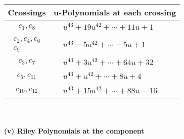 \documentclass[1p]{elsarticle_modified}
\theoremstyle{definition}
\begin{document}
\begin{tabular}{m{50pt}|m{274pt}}
Crossings & \hspace{64pt}u-Polynomials at each crossing \\
\hline $$\begin{aligned}c_{1},c_{8}\end{aligned}$$&$\begin{aligned}
&u^{43}+19 u^{42}+\cdots+11 u+1
\end{aligned}$\\
\hline $$\begin{aligned}c_{2},c_{4},c_{6}\\c_{9}\end{aligned}$$&$\begin{aligned}
&u^{43}-5 u^{42}+\cdots-5 u+1
\end{aligned}$\\
\hline $$\begin{aligned}c_{3},c_{7}\end{aligned}$$&$\begin{aligned}
&u^{43}+3 u^{42}+\cdots+64 u+32
\end{aligned}$\\
\hline $$\begin{aligned}c_{5},c_{11}\end{aligned}$$&$\begin{aligned}
&u^{43}+u^{42}+\cdots+8 u+4
\end{aligned}$\\
\hline $$\begin{aligned}c_{10},c_{12}\end{aligned}$$&$\begin{aligned}
&u^{43}+15 u^{42}+\cdots+88 u-16
\end{aligned}$\\
\hline
\end{tabular}\\~\\
\newpage\renewcommand{\arraystretch}{1}
\flushleft \textbf{(v) Riley Polynomials at the component}\newline \\
\end{document}
